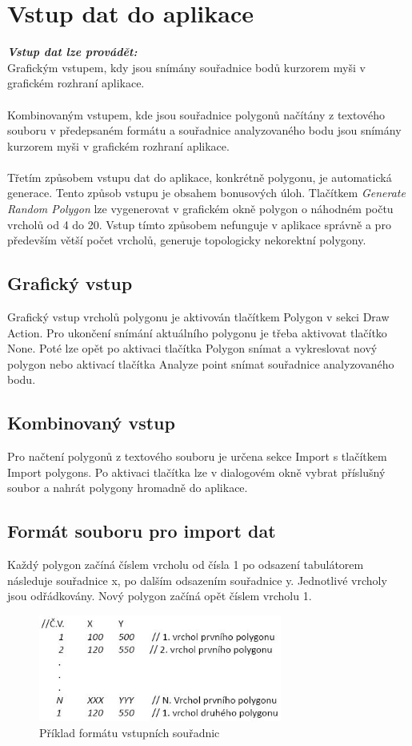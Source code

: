 \documentclass[a4paper, 12pt]{article}
\begin{document}
\section{Vstup dat do aplikace}
\textbf{\textit{Vstup dat lze provádět:}}\\
Grafickým vstupem, kdy jsou snímány souřadnice bodů kurzorem myši v grafickém rozhraní aplikace.\\
\\
Kombinovaným vstupem, kde jsou souřadnice polygonů načítány z textového souboru v předepsaném formátu a souřadnice analyzovaného bodu jsou snímány kurzorem myši v grafickém rozhraní aplikace.\\
\\
Třetím způsobem vstupu dat do aplikace, konkrétně polygonu, je automatická generace. Tento způsob vstupu je obsahem bonusových úloh. Tlačítkem \textit{Generate Random Polygon} lze vygenerovat v grafickém okně polygon o náhodném počtu vrcholů od 4 do 20. Vstup tímto způsobem nefunguje v aplikace správně a pro především větší počet vrcholů, generuje topologicky nekorektní polygony.

\subsection{Grafický vstup}
Grafický vstup vrcholů polygonu je aktivován tlačítkem Polygon v sekci Draw Action. Pro ukončení snímání aktuálního polygonu je třeba aktivovat tlačítko None. Poté lze opět po aktivaci tlačítka Polygon snímat a vykreslovat nový polygon nebo aktivací tlačítka Analyze point snímat souřadnice analyzovaného bodu.

\subsection{Kombinovaný vstup}
Pro načtení polygonů z textového souboru je určena sekce Import s tlačítkem Import polygons. Po aktivaci tlačítka lze v dialogovém okně vybrat příslušný soubor a nahrát polygony hromadně do aplikace.

\subsection{Formát souboru pro import dat}
Každý polygon začíná číslem vrcholu od čísla 1 po odsazení tabulátorem následuje souřadnice x, po dalším odsazením souřadnice y. Jednotlivé vrcholy jsou odřádkovány. Nový polygon začíná opět číslem vrcholu 1.

\begin{figure}[h!]
	\centering
	\includegraphics[width=8cm]{vstup.jpg}
	\caption{Příklad formátu vstupních souřadnic}
\end{figure}
\end{document}
